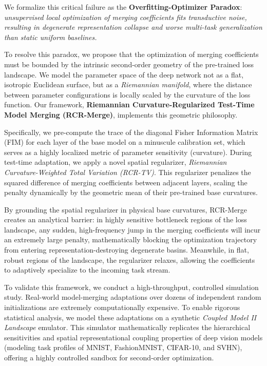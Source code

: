 We formalize this critical failure as the \textbf{Overfitting-Optimizer Paradox}: \emph{unsupervised local optimization of merging coefficients fits transductive noise, resulting in degenerate representation collapse and worse multi-task generalization than static uniform baselines.}

To resolve this paradox, we propose that the optimization of merging coefficients must be bounded by the intrinsic second-order geometry of the pre-trained loss landscape. We model the parameter space of the deep network not as a flat, isotropic Euclidean surface, but as a \emph{Riemannian manifold}, where the distance between parameter configurations is locally scaled by the curvature of the loss function. Our framework, \textbf{Riemannian Curvature-Regularized Test-Time Model Merging (RCR-Merge)}, implements this geometric philosophy. 

Specifically, we pre-compute the trace of the diagonal Fisher Information Matrix (FIM) for each layer of the base model on a minuscule calibration set, which serves as a highly localized metric of parameter sensitivity (curvature). During test-time adaptation, we apply a novel spatial regularizer, \emph{Riemannian Curvature-Weighted Total Variation (RCR-TV)}. This regularizer penalizes the squared difference of merging coefficients between adjacent layers, scaling the penalty dynamically by the geometric mean of their pre-trained base curvatures. 

By grounding the spatial regularizer in physical base curvatures, RCR-Merge creates an analytical barrier: in highly sensitive bottleneck regions of the loss landscape, any sudden, high-frequency jump in the merging coefficients will incur an extremely large penalty, mathematically blocking the optimization trajectory from entering representation-destroying degenerate basins. Meanwhile, in flat, robust regions of the landscape, the regularizer relaxes, allowing the coefficients to adaptively specialize to the incoming task stream.

To validate this framework, we conduct a high-throughput, controlled simulation study. Real-world model-merging adaptations over dozens of independent random initializations are extremely computationally expensive. To enable rigorous statistical analysis, we model these adaptations on a synthetic \emph{Coupled Model II Landscape} emulator. This simulator mathematically replicates the hierarchical sensitivities and spatial representational coupling properties of deep vision models (modeling task profiles of MNIST, FashionMNIST, CIFAR-10, and SVHN), offering a highly controlled sandbox for second-order optimization.

